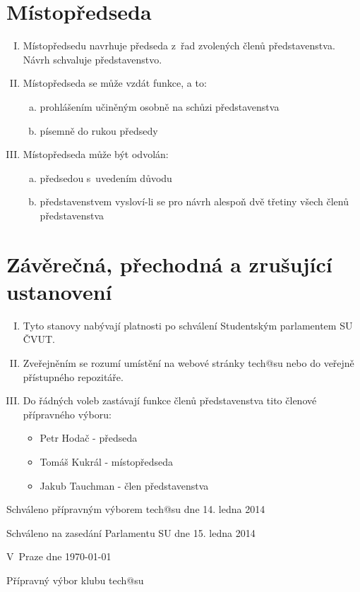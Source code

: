 \documentclass[10pt]{article}
\begin{document}
\section{Místopředseda}
	\begin{enumerate}[I.]
	\item Místopředsedu navrhuje předseda z~řad zvolených členů představenstva. Návrh schvaluje představenstvo.  
	\item Místopředseda se může vzdát funkce, a to:  
		\begin{enumerate}[a.]
		\item prohlášením učiněným osobně na schůzi představenstva
		\item písemně do rukou předsedy  
		\end{enumerate}
	\item Místopředseda může být odvolán:  
		\begin{enumerate}[a.]
		\item předsedou s~uvedením důvodu
		\item představenstvem vysloví-li se pro návrh alespoň dvě třetiny všech členů představenstva
		\end{enumerate}
	\end{enumerate}

\section{Závěrečná, přechodná a zrušující ustanovení}
	\begin{enumerate}[I.]
	\item Tyto stanovy nabývají platnosti po schválení Studentským parlamentem SU ČVUT.
	\item Zveřejněním se rozumí umístění na webové stránky tech@su nebo do veřejně přístupného repozitáře.
	\item Do řádných voleb zastávají funkce členů představenstva tito členové přípravného výboru:
		\begin{itemize}
			\item Petr Hodač - předseda
			\item Tomáš Kukrál - místopředseda
			\item Jakub Tauchman - člen představenstva
		\end{itemize}
	\end{enumerate}


\vspace{10mm}

Schváleno přípravným výborem tech@su dne 14. ledna 2014

Schváleno na zasedání Parlamentu SU dne 15. ledna 2014

\vspace{30mm}

\hfill V~Praze dne \today

\hfill Přípravný výbor klubu tech@su
\end{document}
